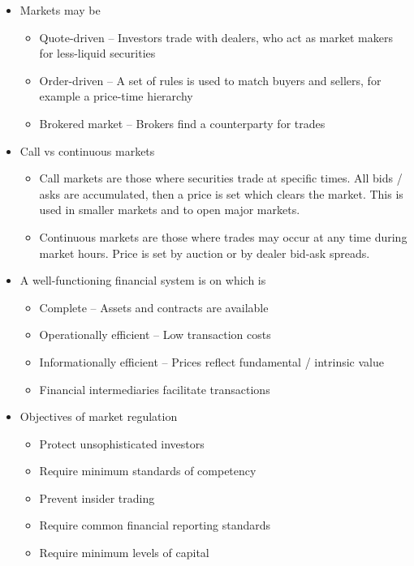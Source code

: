 \documentclass[../notes_compiled.tex]{subfiles}
\begin{document}
\begin{itemize}
\item Markets may be 
\begin{itemize}
\item Quote-driven -- Investors trade with dealers, who act as market makers for less-liquid securities
\item Order-driven -- A set of rules is used to match buyers and sellers, for example a price-time hierarchy
\item Brokered market -- Brokers find a counterparty for trades
\end{itemize}

\item Call vs continuous markets
\begin{itemize}
\item Call markets are those where securities trade at specific times. All bids / asks are accumulated, then a price is set which clears the market. This is used in smaller markets and to open major markets.
\item Continuous markets are those where trades may occur at any time during market hours. Price is set by auction or by dealer bid-ask spreads.
\end{itemize}

\item A well-functioning financial system is on which is
\begin{itemize}
\item Complete -- Assets and contracts are available
\item Operationally efficient -- Low transaction costs
\item Informationally efficient -- Prices reflect fundamental / intrinsic value
\item Financial intermediaries facilitate transactions
\end{itemize}

\item Objectives of market regulation
\begin{itemize}
\item Protect unsophisticated investors
\item Require minimum standards of competency
\item Prevent insider trading
\item Require common financial reporting standards
\item Require minimum levels of capital
\end{itemize}



\end{itemize}
\end{document}
